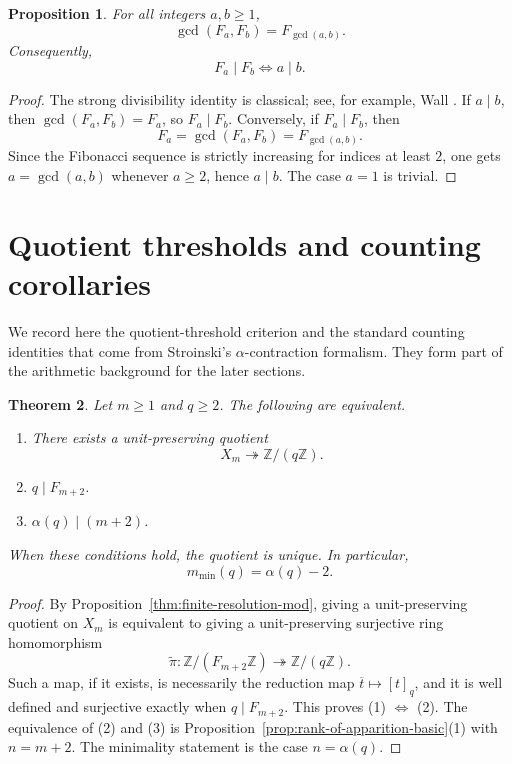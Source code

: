 \documentclass[11pt,letterpaper]{article}
\numberwithin{equation}{section}
\theoremstyle{plain}
\newtheorem{theorem}{Theorem}[section]
\newtheorem{proposition}[theorem]{Proposition}
\theoremstyle{definition}
\theoremstyle{remark}
\newcommand{\ZZ}{\mathbb{Z}}
\begin{document}
\begin{proposition}
\label{prop:fibonacci-strong-divisibility}
For all integers $a,b\ge 1$,
\[
\gcd(F_a,F_b)=F_{\gcd(a,b)}.
\]
Consequently,
\[
F_a\mid F_b \iff a\mid b.
\]
\end{proposition}

\begin{proof}
The strong divisibility identity is classical; see, for example, Wall
\cite{Wall1960FibonacciModm}. If $a\mid b$, then
$\gcd(F_a,F_b)=F_a$, so $F_a\mid F_b$. Conversely, if $F_a\mid F_b$, then
\[
F_a=\gcd(F_a,F_b)=F_{\gcd(a,b)}.
\]
Since the Fibonacci sequence is strictly increasing for indices at least $2$,
one gets $a=\gcd(a,b)$ whenever $a\ge 2$, hence $a\mid b$. The case $a=1$ is
trivial.
\end{proof}

\section{Quotient thresholds and counting corollaries}

We record here the quotient-threshold criterion and the standard counting
identities that come from Stroinski's $\alpha$-contraction formalism. They form
part of the arithmetic background for the later sections.

\begin{theorem}
\label{thm:quotient-observable-threshold}
Let $m\ge 1$ and $q\ge 2$. The following are equivalent.
\begin{enumerate}[label=(\arabic*)]
\item There exists a unit-preserving quotient
\[
X_m\twoheadrightarrow \ZZ/(q\ZZ).
\]
\item $q\mid F_{m+2}$.
\item $\alpha(q)\mid (m+2)$.
\end{enumerate}
When these conditions hold, the quotient is unique. In particular,
\[
m_{\min}(q)=\alpha(q)-2.
\]
\end{theorem}

\begin{proof}
By Proposition~\ref{thm:finite-resolution-mod}, giving a unit-preserving
quotient on $X_m$ is equivalent to giving a unit-preserving surjective ring
homomorphism
\[
\widetilde{\pi}:\ZZ/(F_{m+2}\ZZ)\twoheadrightarrow \ZZ/(q\ZZ).
\]
Such a map, if it exists, is necessarily the reduction map
$\overline{t}\mapsto [t]_q$, and it is well defined and surjective exactly when
$q\mid F_{m+2}$. This proves (1) $\Leftrightarrow$ (2). The equivalence of
(2) and (3) is Proposition~\ref{prop:rank-of-apparition-basic}(1) with
$n=m+2$. The minimality statement is the case $n=\alpha(q)$.
\end{proof}
\end{document}
